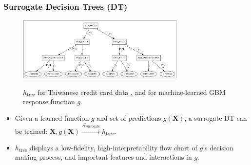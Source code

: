 \documentclass[11pt,aspectratio=169,hyperref={colorlinks}]{beamer}
\begin{document}
	\begin{frame}[t]
	
		\frametitle{Surrogate Decision Trees (DT)}
		
		\begin{figure}[htb]
			\begin{center}
				\includegraphics[height=90pt]{../img/dt_surrogate.png}
				\label{fig:dt_surrogate}
				\caption{$h_{\text{tree}}$ for Taiwanese credit card data \cite{uci}, and for machine-learned GBM response function $g$.}
			\end{center}
		\end{figure}
		
		\vspace{-20 pt}
		
		\begin{itemize}
			
			\item Given a learned function $g$ and set of predictions $g(\mathbf{X})$, a surrogate DT can be trained: $ \mathbf{X}, g(\mathbf{X}) \xrightarrow{\mathcal{A}_{\text{surrogate}}} h_{\text{tree}}$.
			
			\item $h_{\text{tree}}$ displays a low-fidelity, high-interpretability flow chart of $g$'s decision making process, and important features and interactions in $g$.	
			
		\end{itemize}
		
	\end{frame}
	
\end{document}
